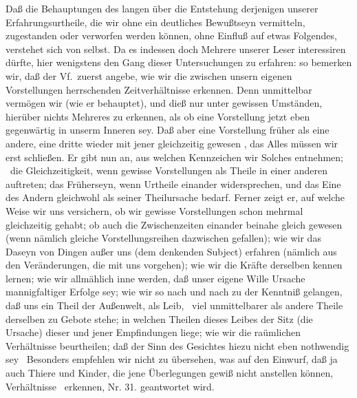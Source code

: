 Daß die Behauptungen des langen  über die Entstehung derjenigen unserer Erfahrungsurtheile, die wir ohne ein deutliches Bewußtseyn vermitteln, zugestanden oder verworfen werden können, ohne Einfluß auf etwas Folgendes, verstehet sich von selbst. Da es indessen doch Mehrere unserer Leser interessiren dürfte, hier wenigstens den Gang dieser Untersuchungen zu erfahren: so bemerken wir, daß der Vf.\ zuerst angebe, wie wir die zwischen unsern eigenen Vorstellungen herrschenden Zeitverhältnisse erkennen. Denn unmittelbar vermögen wir (wie er behauptet), und dieß nur unter gewissen Umständen, hierüber nichts Mehreres zu erkennen, als ob eine Vorstellung jetzt eben gegenwärtig in unserm Inneren sey. Daß aber eine Vorstellung früher als  eine andere, eine dritte wieder mit jener gleichzeitig gewesen \udgl , das Alles müssen wir erst schließen. Er gibt nun an, aus welchen Kennzeichen wir Solches entnehmen; \zB\ die Gleichzeitigkeit, wenn gewisse Vorstellungen als Theile in einer anderen auftreten; das Früherseyn, wenn Urtheile einander widersprechen, und das Eine des Andern gleichwohl als seiner Theilursache bedarf. Ferner zeigt er, auf welche Weise wir uns versichern, ob wir gewisse Vorstellungen schon mehrmal gleichzeitig gehabt; ob auch die Zwischenzeiten einander beinahe gleich gewesen (wenn nämlich gleiche Vorstellungsreihen dazwischen gefallen); wie wir das Daseyn von Dingen außer uns (dem denkenden Subject) erfahren (nämlich aus den Veränderungen, die mit uns vorgehen); wie wir die Kräfte derselben kennen lernen; wie wir allmählich inne werden, daß unser eigene Wille Ursache mannigfaltiger Erfolge sey; wie wir so nach und nach zu der Kenntniß gelangen, daß uns ein Theil der Außenwelt, als Leib, \dh\  viel unmittelbarer als andere Theile derselben zu Gebote stehe; in welchen Theilen dieses Leibes der Sitz (die Ursache) dieser und jener Empfindungen liege; wie wir die raümlichen Verhältnisse beurtheilen; daß der Sinn des Gesichtes hiezu nicht eben nothwendig sey \umA\ Besonders empfehlen wir nicht zu übersehen, was auf den Einwurf, daß ja auch Thiere und Kinder, die jene Überlegungen gewiß nicht anstellen können,  Verhältnisse \umA\  erkennen, Nr. 31. geantwortet wird. \par 
\gliederungslinie\par
